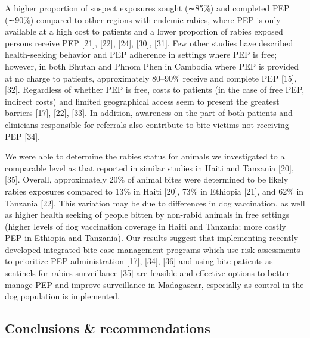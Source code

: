 \documentclass[
]{book}
\begin{document}
A higher proportion of suspect exposures sought (∼85\%) and completed PEP (∼90\%) compared to other regions with endemic rabies, where PEP is only available at a high cost to patients and a lower proportion of rabies exposed persons receive PEP {[}21{]}, {[}22{]}, {[}24{]}, {[}30{]}, {[}31{]}. Few other studies have described health-seeking behavior and PEP adherence in settings where PEP is free; however, in both Bhutan and Phnom Phen in Cambodia where PEP is provided at no charge to patients, approximately 80--90\% receive and complete PEP {[}15{]}, {[}32{]}. Regardless of whether PEP is free, costs to patients (in the case of free PEP, indirect costs) and limited geographical access seem to present the greatest barriers {[}17{]}, {[}22{]}, {[}33{]}. In addition, awareness on the part of both patients and clinicians responsible for referrals also contribute to bite victims not receiving PEP {[}34{]}.

We were able to determine the rabies status for animals we investigated to a comparable level as that reported in similar studies in Haiti and Tanzania {[}20{]}, {[}35{]}. Overall, approximately 20\% of animal bites were determined to be likely rabies exposures compared to 13\% in Haiti {[}20{]}, 73\% in Ethiopia {[}21{]}, and 62\% in Tanzania {[}22{]}. This variation may be due to differences in dog vaccination, as well as higher health seeking of people bitten by non-rabid animals in free settings (higher levels of dog vaccination coverage in Haiti and Tanzania; more costly PEP in Ethiopia and Tanzania). Our results suggest that implementing recently developed integrated bite case management programs which use risk assessments to prioritize PEP administration {[}17{]}, {[}34{]}, {[}36{]} and using bite patients as sentinels for rabies surveillance {[}35{]} are feasible and effective options to better manage PEP and improve surveillance in Madagascar, especially as control in the dog population is implemented.

\hypertarget{conclusions-recommendations}{%
\subsection{Conclusions \& recommendations}\label{conclusions-recommendations}}
\end{document}
